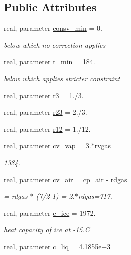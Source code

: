 \subsection*{Public Attributes}
\begin{DoxyCompactItemize}
\item 
real, parameter \hyperlink{classfv__mapz__mod_a7879730f4b2baa275cd6abaf9c369bb5}{consv\-\_\-min} = 0.
\begin{DoxyCompactList}\small\item\em below which no correction applies \end{DoxyCompactList}\item 
real, parameter \hyperlink{classfv__mapz__mod_a7cf7f37723bbfb2e7d6b4d948ea81567}{t\-\_\-min} = 184.
\begin{DoxyCompactList}\small\item\em below which applies stricter constraint \end{DoxyCompactList}\item 
real, parameter \hyperlink{classfv__mapz__mod_a85ad5e9000a3d762fd9a62ce59fa9213}{r3} = 1./3.
\item 
real, parameter \hyperlink{classfv__mapz__mod_a24b67f915ffc43180f28b980d9ca7d4c}{r23} = 2./3.
\item 
real, parameter \hyperlink{classfv__mapz__mod_abb8dc5fd25041ba11e452a3994360336}{r12} = 1./12.
\item 
real, parameter \hyperlink{classfv__mapz__mod_a4c1b41c250d4fae86c8297ebe5f71577}{cv\-\_\-vap} = 3.$\ast$rvgas
\begin{DoxyCompactList}\small\item\em 1384. \end{DoxyCompactList}\item 
real, parameter \hyperlink{classfv__mapz__mod_ac280285d39826f98f83043a75f01d44e}{cv\-\_\-air} = cp\-\_\-air -\/ rdgas
\begin{DoxyCompactList}\small\item\em = rdgas $\ast$ (7/2-\/1) = 2.$\ast$rdgas=717. \end{DoxyCompactList}\item 
real, parameter \hyperlink{classfv__mapz__mod_aaa58d5b9a96c7678b42b9f21dae04d56}{c\-\_\-ice} = 1972.
\begin{DoxyCompactList}\small\item\em heat capacity of ice at -\/15.\-C \end{DoxyCompactList}\item 
real, parameter \hyperlink{classfv__mapz__mod_aa0e5a6070f8657332c3dc64bd06f62bc}{c\-\_\-liq} = 4.\-1855e+3

\end{DoxyCompactItemize}
